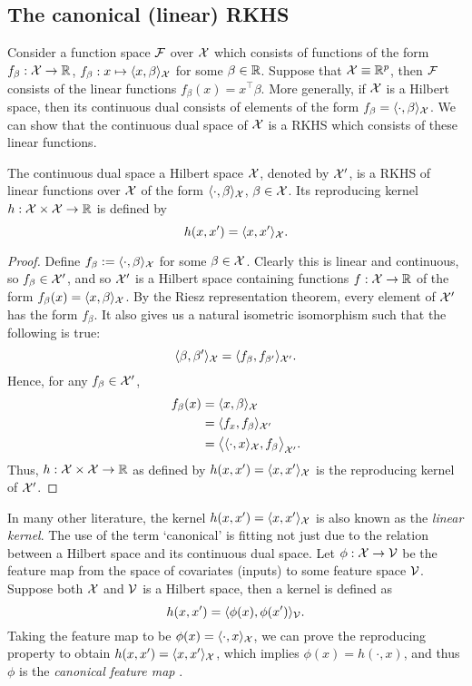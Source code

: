 \subsection{The canonical (linear) RKHS}

Consider a function space ${\mathcal F}$ over ${\mathcal X}$ which consists of functions of the form $f_\beta:{\mathcal X}\to\mathbb{R}$, $f_\beta: x \mapsto \langle x,\beta\rangle_{\mathcal X}$ for some $\beta\in\mathbb{R}$.
Suppose that ${\mathcal X} \equiv \mathbb{R}^p$, then ${\mathcal F}$ consists of the linear functions $f_\beta(x) = x^\top\beta$.
More generally, if ${\mathcal X}$ is a Hilbert space, then its continuous dual consists of elements of the form $f_\beta = \langle\cdot,\beta\rangle_{\mathcal X}$.
We can show that the continuous dual space of ${\mathcal X}$ is a RKHS which consists of these linear functions.

\begin{proposition}
  The continuous dual space a Hilbert space ${\mathcal X}$, denoted by ${\mathcal X}'$, is a RKHS of linear functions over ${\mathcal X}$ of the form $\langle\cdot,\beta\rangle_{\mathcal X}$, $\beta\in{\mathcal X}$. Its reproducing kernel $h:{\mathcal X}\times{\mathcal X}\to\mathbb{R}$ is defined by
  \[
    h(x,x') = \langle x,x'\rangle_{{\mathcal X}}.
  \]
\end{proposition}

\begin{proof}
  Define $f_\beta := \langle\cdot,\beta\rangle_{\mathcal X}$ for some $\beta \in {\mathcal X}$.
  Clearly this is linear and continuous, so $f_\beta\in{\mathcal X}'$, and so ${\mathcal X}'$ is a Hilbert space containing functions $f:{\mathcal X}\to\mathbb{R}$ of the form $f_\beta(x) = \langle x,\beta\rangle_{\mathcal X}$.
  By the Riesz representation theorem, every element of ${\mathcal X}'$ has the form $f_\beta$.
  It also gives us a natural isometric isomorphism such that the following is true:
  \[
    \langle\beta,\beta'\rangle_{\mathcal X} = \langle f_\beta,f_{\beta'}\rangle_{{\mathcal X}'}.
  \]
  Hence, for any $f_\beta\in{\mathcal X}'$, 
  \begin{align*}
    f_\beta(x) 
    &= \langle x,\beta\rangle_{\mathcal X} \\
    &= \langle f_x,f_{\beta}\rangle_{{\mathcal X}'} \\
    &= \big\langle \langle\cdot,x\rangle_{\mathcal X},f_{\beta} \big\rangle_{{\mathcal X}'}.
  \end{align*}
  Thus, $h:{\mathcal X}\times{\mathcal X}\to\mathbb{R}$ as defined by $h(x,x') = \langle x,x'\rangle_{\mathcal X}$ is the reproducing kernel of ${\mathcal X}'$.
\end{proof}

In many other literature, the kernel $h(x,x') = \langle x,x'\rangle_{\mathcal X}$ is also known as the \emph{linear kernel}.
The use of the term `canonical' is fitting not just due to the relation between a Hilbert space and its continuous dual space.
Let $\phi:{\mathcal X}\to{\mathcal V}$ be the feature map from the space of covariates (inputs) to some feature space ${\mathcal V}$.
Suppose both ${\mathcal X}$ and ${\mathcal V}$ is a Hilbert space, then a kernel is defined as 
\[
  h(x,x') = \langle\phi(x),\phi(x')\rangle_{\mathcal V}.
\]
Taking the feature map to be $\phi(x) = \langle\cdot,x\rangle_{\mathcal X}$, we can prove the reproducing property to obtain $h(x,x') = \langle x,x'\rangle_{\mathcal X}$, which implies $\phi(x) = h(\cdot,x)$, and thus $\phi$ is the \emph{canonical feature map} \citep[Lemma 4.19]{steinwart2008support}.

